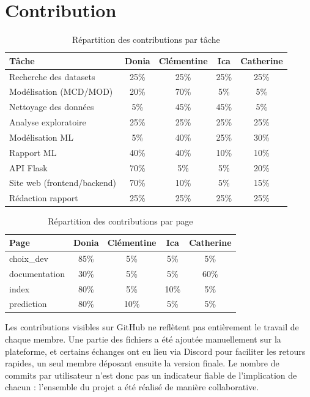 \documentclass[mstat,12pt]{unswthesis}
\begin{document}
\hypertarget{contributionParEtudiant}{%
\section{\textbf{Contribution}}\label{contributionParEtudiant}}

\begin{table}[H]
\centering
\begin{tabular}{|l|c|c|c|c|}
\hline
\textbf{Tâche} & \textbf{Donia} & \textbf{Clémentine} & \textbf{Ica} & \textbf{Catherine} \\
\hline
Recherche des datasets & 25\% & 25\% & 25\% & 25\% \\
\hline
Modélisation (MCD/MOD) & 20\% & 70\% & 5\% & 5\% \\
\hline
Nettoyage des données & 5\% & 45\% & 45\% & 5\% \\
\hline
Analyse exploratoire & 25\% & 25\% & 25\% & 25\% \\
\hline
Modélisation ML & 5\% & 40\% & 25\% & 30\% \\
\hline
Rapport ML & 40\% & 40\% & 10\% & 10\% \\
\hline
API Flask & 70\% & 5\% & 5\% & 20\% \\
\hline
Site web (frontend/backend) & 70\% & 10\% & 5\% & 15\% \\
\hline
Rédaction rapport & 25\% & 25\% & 25\% & 25\% \\
\hline
\end{tabular}
\caption{Répartition des contributions par tâche}
\end{table}


\begin{table}[H]
\centering
\begin{tabular}{|l|c|c|c|c|}
\hline
\textbf{Page} & \textbf{Donia} & \textbf{Clémentine} & \textbf{Ica} & \textbf{Catherine} \\
\hline
choix\_dev & 85\% & 5\% & 5\% & 5\% \\
\hline
documentation & 30\% & 5\% & 5\% & 60\% \\
\hline
index & 80\% & 5\% & 10\% & 5\% \\
\hline
prediction & 80\% & 10\% & 5\% & 5\% \\
\hline
\end{tabular}
\caption{Répartition des contributions par page}
\end{table}

Les contributions visibles sur GitHub ne reflètent pas entièrement le travail de chaque membre. Une partie des fichiers a été ajoutée manuellement sur la plateforme, et certains échanges ont eu lieu via Discord pour faciliter les retours rapides, un seul membre déposant ensuite la version finale. Le nombre de commits par utilisateur n'est donc pas un indicateur fiable de l'implication de chacun : l'ensemble du projet a été réalisé de manière collaborative.
\end{document}
